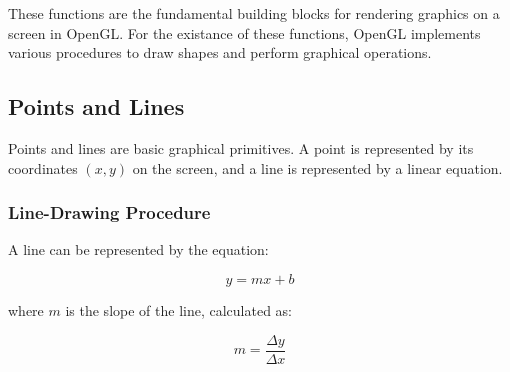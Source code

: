 
These functions are the fundamental building blocks for rendering graphics on a screen in OpenGL. 
For the existance of these functions, 
OpenGL implements various procedures to draw shapes and perform graphical operations.

\subsection*{Points and Lines}

Points and lines are basic graphical primitives. A point is represented by its coordinates \((x, y)\) on the screen, and a line is represented by a linear equation.

\subsubsection*{Line-Drawing Procedure}

A line can be represented by the equation:

\begin{equation}
  y = mx + b
\end{equation}

where \( m \) is the slope of the line, calculated as:

\begin{equation}
  m = \frac{\Delta y}{\Delta x}
\end{equation}





